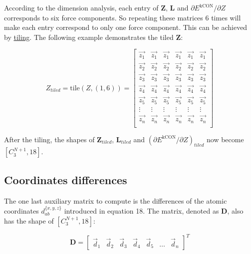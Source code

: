 According to the dimension analysis, each entry of \textbf{Z}, \textbf{L} and 
$\partial{E^{\mathrm{kCON}}} / \partial{Z}$ corresponds to six force components. So repeating 
these matrices 6 times will make each entry correspond to only one force component. This can
be achieved by  
\href{https://docs.scipy.org/doc/numpy/reference/generated/numpy.tile.html}{tiling}.
The following example demonstrates the tiled \textbf{Z}:

\begin{equation}
Z_{tiled} = \mathrm{tile}(Z, (1,6)) = \left[
\begin{array}{cccccc}
	\vec{z_{1}} & \vec{z_{1}} & \vec{z_{1}} & \vec{z_{1}} & \vec{z_{1}} & \vec{z_{1}}  \\
	\vec{z_{2}} & \vec{z_{2}} & \vec{z_{2}} & \vec{z_{2}} & \vec{z_{2}} & \vec{z_{2}}  \\
	\vec{z_{3}} & \vec{z_{3}} & \vec{z_{3}} & \vec{z_{3}} & \vec{z_{3}} & \vec{z_{3}}  \\
	\vec{z_{4}} & \vec{z_{4}} & \vec{z_{4}} & \vec{z_{4}} & \vec{z_{4}} & \vec{z_{4}}  \\
	\vec{z_{5}} & \vec{z_{5}} & \vec{z_{5}} & \vec{z_{5}} & \vec{z_{5}} & \vec{z_{5}}  \\
	\vdots      & \vdots      & \vdots      & \vdots      & \vdots      & \vdots       \\
	\vec{z_{n}} & \vec{z_{n}} & \vec{z_{n}} & \vec{z_{n}} & \vec{z_{n}} & \vec{z_{n}}  \\
		\end{array}
	\right]
\end{equation}

\noindent After the tiling, the shapes of $\boldsymbol{Z}_{tiled}$, $\boldsymbol{L}_{tiled}$ 
and $(\partial{E^{\mathrm{kCON}}} / \partial{Z})_{tiled}$ now become $[C^{N+1}_{3}, 18]$.

\subsection{Coordinates differences}

The one last auxiliary matrix to compute is the differences of the atomic coordinates 
$d^{\{x, y, z\}}_{ab}$ introduced in equation 18. The matrix, denoted as \textbf{D}, also has 
the shape of $[C^{N+1}_{3}, 18]$:

\begin{equation}
\mathbf{D} = \left[ 
\begin{array}{ccccccc}
\vec{d}_1 & \vec{d}_2 & \vec{d}_3 & \vec{d}_4 & \vec{d}_5 & \dots & \vec{d}_n 
\end{array}
\right]^T
\end{equation}

